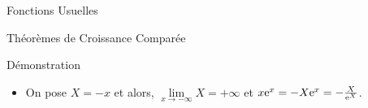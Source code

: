 \documentclass{coursbook}
\begin{document}
\begin{Gpartie}{Fonctions Usuelles}
\begin{Spartie}{Théorèmes de Croissance Comparée}
\begin{SSpartie}{Démonstration}
\begin{itemize}
                    Soit $f$ définie sur $\big]0\,;+\infty\big[$ par $f(x)=\me^x-\frac{x^2}{2}$. Étudions les variations de $f$.

                    $f'(x)=\me^x-x$ on ne conclut pas directement sur le signe. Dérivons encore :

                    $f''(x)=\me^x-1\quad\text{et}\quad \me^x-1>0\iff \me^x>1\iff x>0$

                    Donc, $f''(x)$ est strictement positive pour $x>0$.

                    Ainsi on a $f'(x)$ strictement croissante sur $\big]0\,;+\infty\big[$ et comme $f'(0)=1>0$, $f'$ est strictement positive sur $\big]0\,;+\infty\big[$ :
                    \begin{center}                        
                        \vspace*{2ex}
                        \parbox{\linewidth}{}
                        \vspace*{2ex}
                    \end{center}
                    Donc, pour tout $x\in\big]0\,;+\infty\big[,~\me^x-\frac{x^2}{2}>0$ et donc $\me^x>\frac{x^2}{2}$. \\ Comme $x>0$ on peut diviser par $x$ : \\ Donc, $\frac{\me^x}{x}>\frac{x}{2}$ et comme $\lim\limits_{x\to+\infty}\frac{x}{2}=+\infty$, par comparaison : \[\lim\limits_{x\to+\infty}\frac{\me^x}{x}=+\infty\quad\square\]
                    \item On pose $X=-x$ et alors, $\lim\limits_{x\to-\infty}X=+\infty$ et $x\me^x=-X\me^{x}=-\frac{X}{\me^X}$.
                    

\end{itemize}
\end{SSpartie}
\end{Spartie}
\end{Gpartie}
\end{document}

